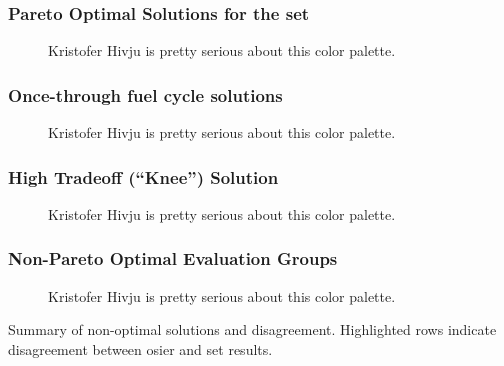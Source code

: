 \begin{frame}
  \frametitle{Pareto Optimal Solutions for the \gls{set}}
        
  \begin{figure}[htbp!]
    \begin{center}
      \resizebox{0.85\columnwidth}{!}{}
    \end{center}
          \caption{Kristofer Hivju is pretty serious about this color palette.}
    \label{fig:full-set-pcp}
  \end{figure}
\end{frame}

\begin{frame}
  \frametitle{Once-through fuel cycle solutions}
        
  \begin{figure}[htbp!]
    \begin{center}
      \resizebox{0.85\columnwidth}{!}{}
    \end{center}
          \caption{Kristofer Hivju is pretty serious about this color palette.}
    \label{fig:once-through-pcp}
  \end{figure}
\end{frame}

\begin{frame}
  \frametitle{High Tradeoff (``Knee'') Solution}
        
  \begin{figure}[htbp!]
    \begin{center}
      \resizebox{0.85\columnwidth}{!}{}
    \end{center}
          \caption{Kristofer Hivju is pretty serious about this color palette.}
    \label{fig:single-eg-pcp}
  \end{figure}
\end{frame}

\begin{frame}
  \frametitle{Non-Pareto Optimal Evaluation Groups}
        
  \begin{figure}[htbp!]
    \begin{center}
      \resizebox{0.85\columnwidth}{!}{}
    \end{center}
          \caption{Kristofer Hivju is pretty serious about this color palette.}
    \label{fig:non-optimal-pcp}
  \end{figure}
\end{frame}


\begin{frame}
    \begin{table}
        \centering
        \caption{Summary of non-optimal solutions and disagreement. Highlighted rows indicate disagreement between \Gls{osier} and \Gls{set} results.}
        \label{tab:non-optimal-subset}
        \resizebox{0.8\columnwidth}{!}{}
    \end{table}
\end{frame}